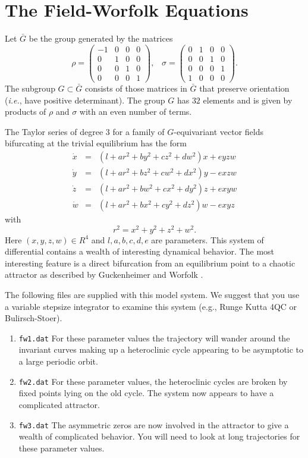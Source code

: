 \section{The Field-Worfolk Equations}

Let $\bar{G}$ be the group generated by the matrices
\[ \rho = \left( \begin{array}{cccc}
-1&0&0&0\\ 0&1&0&0 \\ 0&0&1&0 \\ 0&0&0&1
\end{array} \right),  \; \; \;
\sigma = \left( \begin{array}{cccc}
0&1&0&0 \\ 0&0&1&0 \\ 0&0&0&1 \\ 1&0&0&0
\end{array} \right). \]
The subgroup $G \subset \bar{G}$ consists of those matrices in $\bar{G}$
that preserve orientation ({\it i.e.}, have positive determinant).  The group
$G$ has $32$ elements and is given by products of $\rho$ and $\sigma$ with an 
even number of terms.

The Taylor
series of degree $3$ for a family of $G$-equivariant vector fields
bifurcating at the trivial equilibrium has the form
\begin{eqnarray*}
\dot{x} &=& (l+ar^2+by^2+cz^2+dw^2)x+eyzw \\
\dot{y} &=& (l+ar^2+bz^2+cw^2+dx^2)y-exzw \\
\dot{z} &=& (l+ar^2+bw^2+cx^2+dy^2)z+exyw \\
\dot{w} &=& (l+ar^2+bx^2+cy^2+dz^2)w-exyz 
\end{eqnarray*}
with $$r^2 = x^2+y^2+z^2+w^2.$$ Here $(x,y,z,w) \in
R^4$ and $l,a,b,c,d,e$ are parameters.
This system of differential contains a wealth of interesting dynamical
behavior.  The most interesting feature is a direct bifurcation
from an equilibrium point to a chaotic attractor as described by
Guckenheimer and Worfolk \cite{GuckenheimerWorfolk:instant}.

The following files are supplied with this model system.  We
suggest that you use a variable stepsize integrator to examine this
system (e.g., Runge Kutta 4QC or Bulirsch-Stoer).
\begin{enumerate}
\item {\tt fw1.dat}
For these parameter values the trajectory will wander around the invariant curves
making up a heteroclinic cycle appearing to be asymptotic to a large periodic orbit.
\item {\tt fw2.dat}
For these parameter values, the heteroclinic cycles are broken by fixed points
lying on the old cycle.  The system now appears to have a complicated
attractor.
\item{\tt fw3.dat}
The asymmetric zeros are now involved in the attractor to give
a wealth of complicated behavior.  You will need to look at long trajectories
for these parameter values.
\end{enumerate}

